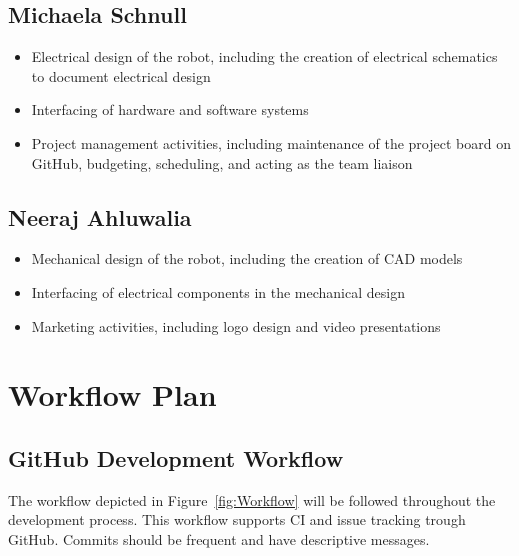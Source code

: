\documentclass[titlepage]{article}
\begin{document}
\subsection{Michaela Schnull}
\begin{itemize}
\item Electrical design of the robot, including the creation of electrical schematics to document electrical design
\item Interfacing of hardware and software systems
\item Project management activities, including maintenance of the project board on GitHub, budgeting, scheduling, and acting as the team liaison
\end{itemize}

\subsection{Neeraj Ahluwalia}
\begin{itemize}
\item Mechanical design of the robot, including the creation of CAD models
\item Interfacing of electrical components in the mechanical design
\item Marketing activities, including logo design and video presentations
\end{itemize}

\section{Workflow Plan}

\subsection{GitHub Development Workflow}

The workflow depicted in Figure~\ref{fig:Workflow} will be followed throughout the development process. This workflow supports CI and issue tracking trough GitHub. Commits should be frequent and have descriptive messages.
\end{document}
